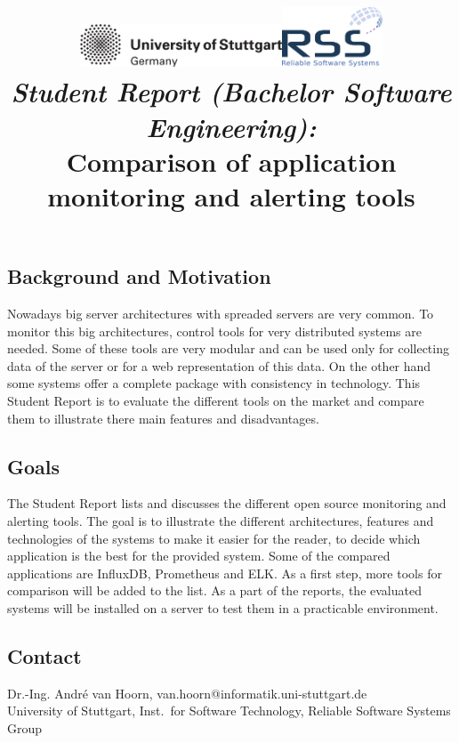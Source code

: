 \documentclass[a4paper,12pt]{article}
\date{}
\title{
\includegraphics[width=6cm]{figures/stuttgart-vector.pdf}\hfill{\includegraphics[width=3cm]{figures/rss_logo.pdf}}
\quad \\ [0.5cm]
{\large \textit{Student Report (Bachelor Software Engineering):}} \\ [1mm]
{\Large Comparison of application monitoring and alerting tools}
}
\begin{document}
	

\maketitle

\thispagestyle{empty}

\vspace{-2.5cm}


\subsection*{Background and Motivation}
Nowadays big server architectures with spreaded servers are very common. To monitor this big architectures, control tools for very distributed systems are needed. Some of these tools are very modular and can be used only for collecting data of the server or for a web representation of this data. On the other hand some systems offer a complete package with consistency in technology.\cite{Heger2017}
This Student Report is to evaluate the different tools on the market and compare them to illustrate there main features and disadvantages.

\subsection*{Goals}
The Student Report lists and discusses the different open source monitoring and alerting tools. The goal is to illustrate the different architectures, features and technologies of the systems to make it easier for the reader, to decide which application is the best for the provided system.
Some of the compared applications are InfluxDB, Prometheus and ELK. As a first step, more tools for comparison will be added to the list.
As a part of the reports, the evaluated systems will be installed on a server to test them in a practicable environment.


\begin{scriptsize}


\end{scriptsize}

\subsection*{Contact}
Dr.-Ing. André van Hoorn, van.hoorn@informatik.uni-stuttgart.de \\
University of Stuttgart, Inst.\ for Software Technology, Reliable Software Systems Group \\
\end{document}
